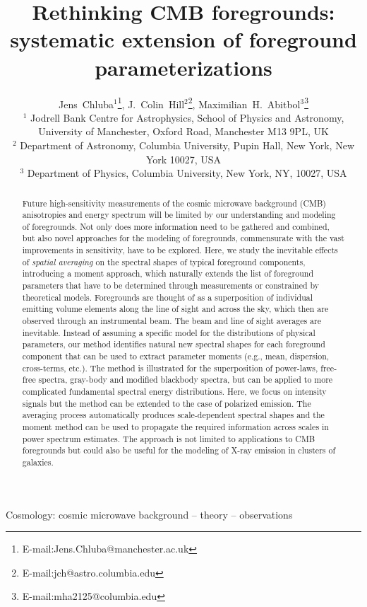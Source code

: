 \documentclass[usenatbib]{mn2e}
\title[Rethinking CMB foregrounds]
{Rethinking CMB foregrounds: systematic extension of foreground parameterizations}
\author[Chluba et al.]{Jens~Chluba$^{1}$\thanks{E-mail:Jens.Chluba@manchester.ac.uk}, J.~Colin~Hill$^2$\thanks{E-mail:jch@astro.columbia.edu}, Maximilian~H.~Abitbol$^3$\thanks{E-mail:mha2125@columbia.edu}
\\
$^{1}$ Jodrell Bank Centre for Astrophysics, School of Physics and Astronomy, University of Manchester, Oxford Road, Manchester M13 9PL, UK
\\
$^{2}$ Department of Astronomy, Columbia University, Pupin Hall, New York, New York 10027, USA
\\
$^{3}$ Department of Physics, Columbia University, New York, NY, 10027, USA
}
\begin{document}
\date{\vspace{-5.9mm}{Accepted 2017 July 31. Received 2017 January 1}}

\maketitle

\begin{abstract}
%
Future high-sensitivity measurements of the cosmic microwave background (CMB) anisotropies and energy spectrum will be limited by our understanding and modeling of foregrounds. Not only does more information need to be gathered and combined, but also novel approaches for the modeling of foregrounds, commensurate with the vast improvements in sensitivity, have to be explored. Here, we study the inevitable effects of {\it spatial averaging} on the spectral shapes of typical foreground components, introducing a moment approach, which naturally extends the list of foreground parameters that have to be determined through measurements or constrained by theoretical models. Foregrounds are thought of as a superposition of individual emitting volume elements along the line of sight and across the sky, which then are observed through an instrumental beam. The beam and line of sight averages are inevitable. Instead of assuming a specific model for the distributions of physical parameters, our method identifies natural new spectral shapes for each foreground component that can be used to extract parameter moments (e.g., mean, dispersion, cross-terms, etc.). The method is illustrated for the superposition of power-laws, free-free spectra, gray-body and modified blackbody spectra, but can be applied to more complicated fundamental spectral energy distributions. Here, we focus on intensity signals but the method can be extended to the case of polarized emission. The averaging process automatically produces scale-dependent spectral shapes and the moment method can be used to propagate the required information across scales in power spectrum estimates. The approach is not limited to applications to CMB foregrounds but could also be useful for the modeling of X-ray emission in clusters of galaxies.
%
\end{abstract}

\begin{keywords}
Cosmology: cosmic microwave background -- theory -- observations
\end{keywords}
\end{document}

